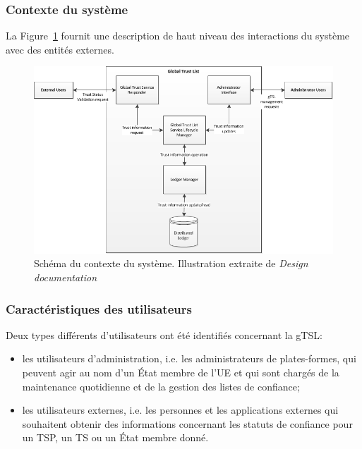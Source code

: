 \documentclass{tnreport}
\begin{document}
\subsubsection{Contexte du système}
La Figure~\ref{fig:system-context-diagram} fournit une description de haut niveau des interactions du système avec des entités externes.
\begin{figure}[h]
	\centering
	\includegraphics[scale=0.82]{figures/gTSL-SystemContextDiagram}
	\caption{Schéma du contexte du système. Illustration extraite de \textit{Design documentation}~\cite{design-document}}
	\label{fig:system-context-diagram}
\end{figure}
\fi


\subsubsection{Caractéristiques des utilisateurs}

Deux types différents d'utilisateurs ont été identifiés concernant la gTSL:
\begin{itemize}
	\item les utilisateurs d'administration, i.e. les administrateurs de plates-formes, qui peuvent agir au nom d'un État membre de l'UE et qui sont chargés de la maintenance quotidienne et de la gestion des listes de confiance;
	\item les utilisateurs externes, i.e. les personnes et les applications externes qui souhaitent obtenir des informations concernant les statuts de confiance pour un TSP, un TS ou un État membre donné.
\end{itemize}
\end{document}
